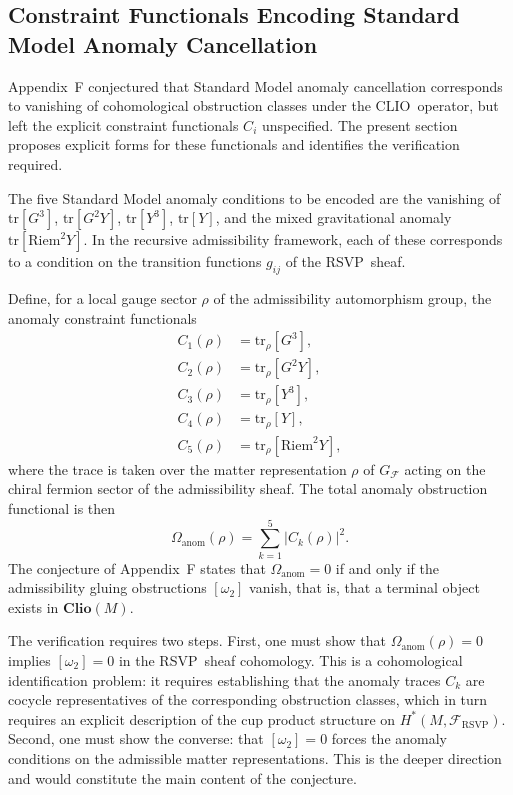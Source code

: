 \documentclass[12pt,a4paper]{article}
\newcommand{\RSVP}{\textrm{RSVP}}
\newcommand{\CLIO}{\textrm{CLIO}}
\newcommand{\Sheaf}{\mathcal{F}}
\begin{document}
\subsection{Constraint Functionals Encoding Standard Model Anomaly Cancellation}

Appendix~F conjectured that Standard Model anomaly cancellation corresponds to
vanishing of cohomological obstruction classes under the \CLIO\ operator, but
left the explicit constraint functionals $C_i$ unspecified. The present section
proposes explicit forms for these functionals and identifies the verification
required.

The five Standard Model anomaly conditions to be encoded are the vanishing of
$\mathrm{tr}[G^3]$, $\mathrm{tr}[G^2 Y]$, $\mathrm{tr}[Y^3]$,
$\mathrm{tr}[Y]$, and the mixed gravitational anomaly
$\mathrm{tr}[\mathrm{Riem}^2 Y]$. In the recursive admissibility framework,
each of these corresponds to a condition on the transition functions $g_{ij}$
of the \RSVP\ sheaf.

Define, for a local gauge sector $\rho$ of the admissibility automorphism group,
the anomaly constraint functionals
\begin{align*}
C_1(\rho) &= \mathrm{tr}_\rho[G^3],\\
C_2(\rho) &= \mathrm{tr}_\rho[G^2 Y],\\
C_3(\rho) &= \mathrm{tr}_\rho[Y^3],\\
C_4(\rho) &= \mathrm{tr}_\rho[Y],\\
C_5(\rho) &= \mathrm{tr}_\rho[\mathrm{Riem}^2 Y],
\end{align*}
where the trace is taken over the matter representation $\rho$ of
$G_\mathcal{F}$ acting on the chiral fermion sector of the admissibility sheaf.
The total anomaly obstruction functional is then
\[
\Omega_\mathrm{anom}(\rho) = \sum_{k=1}^5 |C_k(\rho)|^2.
\]
The conjecture of Appendix~F states that $\Omega_\mathrm{anom}=0$ if and only
if the admissibility gluing obstructions $[\omega_2]$ vanish, that is, that a
terminal object exists in $\mathbf{Clio}(M)$.

The verification requires two steps. First, one must show that
$\Omega_\mathrm{anom}(\rho)=0$ implies $[\omega_2]=0$ in the \RSVP\ sheaf
cohomology. This is a cohomological identification problem: it requires
establishing that the anomaly traces $C_k$ are cocycle representatives of the
corresponding obstruction classes, which in turn requires an explicit
description of the cup product structure on $H^\ast(M,\Sheaf_\RSVP)$. Second,
one must show the converse: that $[\omega_2]=0$ forces the anomaly conditions
on the admissible matter representations. This is the deeper direction and
would constitute the main content of the conjecture.
\end{document}
